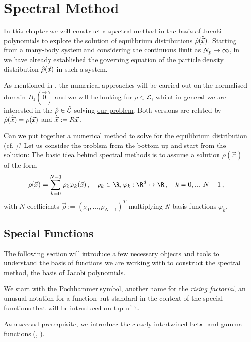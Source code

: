 \chapter{Spectral Method}
\label{chap:spectral-method}
In this chapter we will construct a spectral method in the basis of Jacobi polynomials to explore the solution of equilibrium distributions $\hat{\rho}(\hat{\vec{x}})$.
Starting from a many-body system and considering the continuous limit as $N_p \rightarrow \infty$, in  we have already established the governing equation of the particle density distribution $\hat{\rho}(\hat{\vec{x}})$ in such a system.

As mentioned in , the numerical approaches will be carried out on the normalised domain $B_1(\vec{0})$ and we will be looking for $\rho \in \mathcal{L}$, whilst in general we are interested in the $\hat{\rho} \in \hat{\mathcal{L}}$ solving \href{def:the-problem}{our problem}.
Both versions are related by $\hat{\rho}(\hat{\vec{x}}) = \rho(\vec{x})$ and $\hat{\vec{x}} := R \vec{x}$.

Can we put together a numerical method to solve for the equilibrium distribution (cf. )?
Let us consider the problem from the bottom up and start from the solution:
The basic idea behind spectral methods is to assume a solution $\rho(\vec{x})$ of the form
$$\rho(\vec{x}) = \sum_{k=0}^{N-1} \rho_k \varphi_k(\vec{x})\,,\quad \rho_k \in \R, \varphi_k: \R^d \mapsto \R\,,\quad k = 0, ..., N-1\,,$$
with $N$ coefficients $\vec{\rho} := \left(\rho_0, ..., \rho_{N-1}\right)^T$ multiplying $N$ basis functions $\varphi_k$.

\pagebreak
\section{Special Functions}
The following section will introduce a few necessary objects and tools to understand the basis of functions we are working with to construct the spectral method, the basis of Jacobi polynomials.

We start with the Pochhammer symbol, another name for the \textit{rising factorial}, an unusual notation for a function but standard in the context of the special functions that will be introduced on top of it.


As a second prerequisite, we introduce the closely intertwined beta- and gamma-functions (, ).



